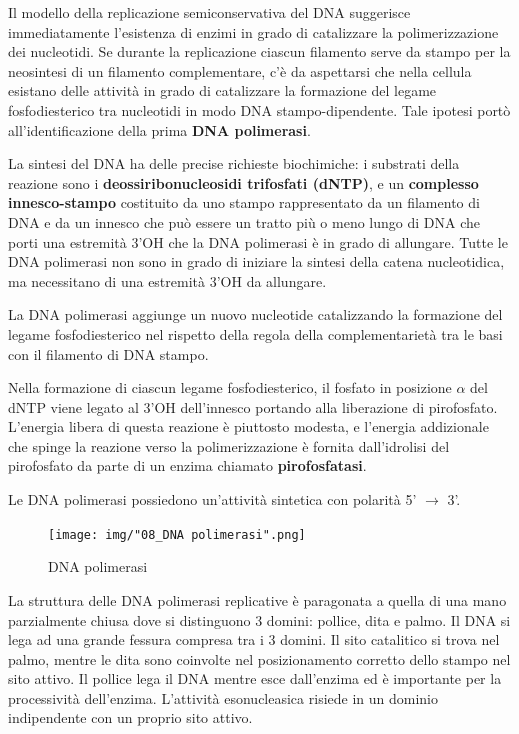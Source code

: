 \documentclass[11pt]{book}
\begin{document}
Il modello della replicazione semiconservativa del DNA suggerisce
immediatamente l'esistenza di enzimi in grado di catalizzare la
polimerizzazione dei nucleotidi. Se durante la replicazione ciascun
filamento serve da stampo per la neosintesi di un filamento
complementare, c'è da aspettarsi che nella cellula esistano delle
attività in grado di catalizzare la formazione del legame
fosfodiesterico tra nucleotidi in modo DNA stampo-dipendente. Tale
ipotesi portò all'identificazione della prima \textbf{DNA polimerasi}.

La sintesi del DNA ha delle precise richieste biochimiche: i substrati
della reazione sono i \textbf{deossiribonucleosidi trifosfati (dNTP)}, e
un \textbf{complesso innesco-stampo} costituito da uno stampo
rappresentato da un filamento di DNA e da un innesco che può essere un
tratto più o meno lungo di DNA che porti una estremità 3'OH che la DNA
polimerasi è in grado di allungare. Tutte le DNA polimerasi non sono in
grado di iniziare la sintesi della catena nucleotidica, ma necessitano
di una estremità 3'OH da allungare.

La DNA polimerasi aggiunge un nuovo nucleotide catalizzando la
formazione del legame fosfodiesterico nel rispetto della regola della
complementarietà tra le basi con il filamento di DNA stampo.

Nella formazione di ciascun legame fosfodiesterico, il fosfato in
posizione \(\alpha\) del dNTP viene legato al 3'OH dell'innesco portando
alla liberazione di pirofosfato. L'energia libera di questa reazione è
piuttosto modesta, e l'energia addizionale che spinge la reazione verso
la polimerizzazione è fornita dall'idrolisi del pirofosfato da parte di
un enzima chiamato \textbf{pirofosfatasi}.

Le DNA polimerasi possiedono un'attività sintetica con polarità 5'
\(\rightarrow\) 3'.

\clearpage
\begin{figure}[htp]
\centering
\texttt{[image: img/"08\_DNA polimerasi".png]}
\caption{DNA polimerasi}
\label{dna-polimerasi}
\end{figure}

La struttura delle DNA polimerasi replicative è paragonata a quella di
una mano parzialmente chiusa dove si distinguono 3 domini: pollice, dita
e palmo. Il DNA si lega ad una grande fessura compresa tra i 3 domini.
Il sito catalitico si trova nel palmo, mentre le dita sono coinvolte nel
posizionamento corretto dello stampo nel sito attivo. Il pollice lega il
DNA mentre esce dall'enzima ed è importante per la processività
dell'enzima. L'attività esonucleasica risiede in un dominio indipendente
con un proprio sito attivo.
\end{document}
